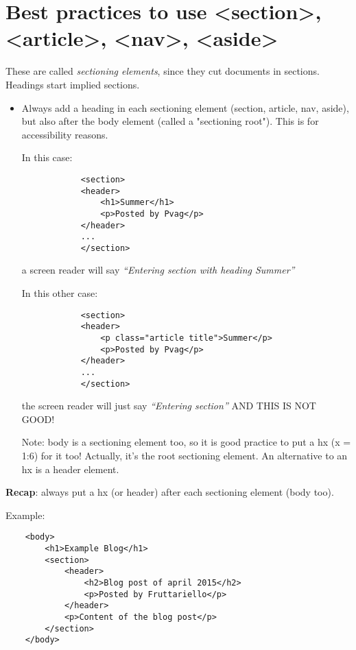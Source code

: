 \documentclass[a4paper,11pt]{book}
\begin{document}
    \section{Best practices to use <section>, <article>, <nav>, <aside>}
    These are called \emph{sectioning elements}, since they cut documents in sections.
    Headings start implied sections.
    \begin{itemize}
        \item Always add a heading in each sectioning element (section, article, nav, aside),
            but also after the body element (called a "sectioning root").
            This is for accessibility reasons.

            In this case:
            \begin{verbatim}
            <section>
            <header>
                <h1>Summer</h1>
                <p>Posted by Pvag</p>
            </header>
            ...
            </section>
            \end{verbatim}
            a screen reader will say
            \emph{``Entering section with heading Summer''}

            In this other case:
            \begin{verbatim}
            <section>
            <header>
                <p class="article title">Summer</p>
                <p>Posted by Pvag</p>
            </header>
            ...
            </section>
            \end{verbatim}
            the screen reader will just say
            \emph{``Entering section''} \large{AND THIS IS NOT GOOD!}

            Note: body is a sectioning element too, so it is good practice
            to put a hx (x = 1:6) for it too! Actually, it's the root sectioning
            element. An alternative to an hx is a header element.
    \end{itemize}

    \textbf{Recap}: always put a hx (or header) after each sectioning element (body too).

    Example:
    \begin{verbatim}
    <body>
        <h1>Example Blog</h1>
        <section>
            <header>
                <h2>Blog post of april 2015</h2>
                <p>Posted by Fruttariello</p>
            </header>
            <p>Content of the blog post</p>
        </section>
    </body>
    \end{verbatim}
\end{document}

